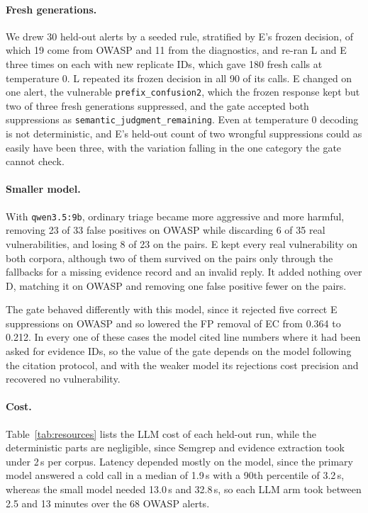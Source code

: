 \paragraph{Fresh generations.}
We drew 30 held-out alerts by a seeded rule, stratified by E's frozen decision, of which 19 come from OWASP and 11 from the diagnostics, and re-ran L and E three times on each with new replicate IDs, which gave 180 fresh calls at temperature 0. L repeated its frozen decision in all 90 of its calls. E changed on one alert, the vulnerable \texttt{prefix\_confusion2}, which the frozen response kept but two of three fresh generations suppressed, and the gate accepted both suppressions as \texttt{semantic\_judgment\_remaining}. Even at temperature 0 decoding is not deterministic, and E's held-out count of two wrongful suppressions could as easily have been three, with the variation falling in the one category the gate cannot check.

\paragraph{Smaller model.}
With \texttt{qwen3.5:9b}, ordinary triage became more aggressive and more harmful, removing 23 of 33 false positives on OWASP while discarding 6 of 35 real vulnerabilities, and losing 8 of 23 on the pairs. E kept every real vulnerability on both corpora, although two of them survived on the pairs only through the fallbacks for a missing evidence record and an invalid reply. It added nothing over D, matching it on OWASP and removing one false positive fewer on the pairs.

The gate behaved differently with this model, since it rejected five correct E suppressions on OWASP and so lowered the FP removal of EC from 0.364 to 0.212. In every one of these cases the model cited line numbers where it had been asked for evidence IDs, so the value of the gate depends on the model following the citation protocol, and with the weaker model its rejections cost precision and recovered no vulnerability.

\paragraph{Cost.}
Table~\ref{tab:resources} lists the LLM cost of each held-out run, while the deterministic parts are negligible, since Semgrep and evidence extraction took under 2\,s per corpus. Latency depended mostly on the model, since the primary model answered a cold call in a median of 1.9\,s with a 90th percentile of 3.2\,s, whereas the small model needed 13.0\,s and 32.8\,s, so each LLM arm took between 2.5 and 13 minutes over the 68 OWASP alerts.

